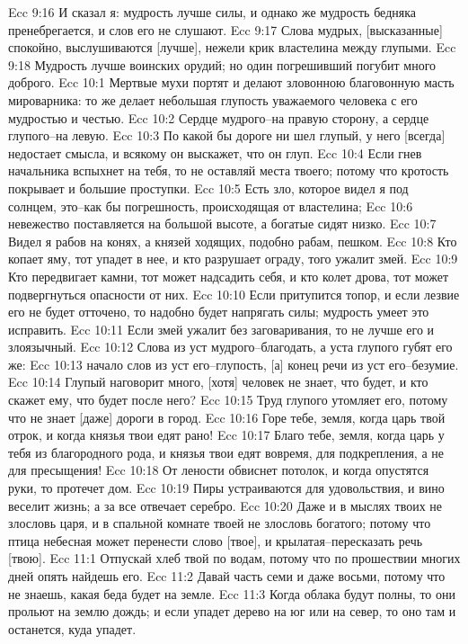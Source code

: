 Ecc 9:16  И сказал я: мудрость лучше силы, и однако же мудрость бедняка пренебрегается, и слов его не слушают.
Ecc 9:17  Слова мудрых, [высказанные] спокойно, выслушиваются [лучше], нежели крик властелина между глупыми.
Ecc 9:18  Мудрость лучше воинских орудий; но один погрешивший погубит много доброго.
Ecc 10:1  Мертвые мухи портят и делают зловонною благовонную масть мироварника: то же делает небольшая глупость уважаемого человека с его мудростью и честью.
Ecc 10:2  Сердце мудрого--на правую сторону, а сердце глупого--на левую.
Ecc 10:3  По какой бы дороге ни шел глупый, у него [всегда] недостает смысла, и всякому он выскажет, что он глуп.
Ecc 10:4  Если гнев начальника вспыхнет на тебя, то не оставляй места твоего; потому что кротость покрывает и большие проступки.
Ecc 10:5  Есть зло, которое видел я под солнцем, это--как бы погрешность, происходящая от властелина;
Ecc 10:6  невежество поставляется на большой высоте, а богатые сидят низко.
Ecc 10:7  Видел я рабов на конях, а князей ходящих, подобно рабам, пешком.
Ecc 10:8  Кто копает яму, тот упадет в нее, и кто разрушает ограду, того ужалит змей.
Ecc 10:9  Кто передвигает камни, тот может надсадить себя, и кто колет дрова, тот может подвергнуться опасности от них.
Ecc 10:10  Если притупится топор, и если лезвие его не будет отточено, то надобно будет напрягать силы; мудрость умеет это исправить.
Ecc 10:11  Если змей ужалит без заговаривания, то не лучше его и злоязычный.
Ecc 10:12  Слова из уст мудрого--благодать, а уста глупого губят его же:
Ecc 10:13  начало слов из уст его--глупость, [а] конец речи из уст его--безумие.
Ecc 10:14  Глупый наговорит много, [хотя] человек не знает, что будет, и кто скажет ему, что будет после него?
Ecc 10:15  Труд глупого утомляет его, потому что не знает [даже] дороги в город.
Ecc 10:16  Горе тебе, земля, когда царь твой отрок, и когда князья твои едят рано!
Ecc 10:17  Благо тебе, земля, когда царь у тебя из благородного рода, и князья твои едят вовремя, для подкрепления, а не для пресыщения!
Ecc 10:18  От лености обвиснет потолок, и когда опустятся руки, то протечет дом.
Ecc 10:19  Пиры устраиваются для удовольствия, и вино веселит жизнь; а за все отвечает серебро.
Ecc 10:20  Даже и в мыслях твоих не злословь царя, и в спальной комнате твоей не злословь богатого; потому что птица небесная может перенести слово [твое], и крылатая--пересказать речь [твою].
Ecc 11:1  Отпускай хлеб твой по водам, потому что по прошествии многих дней опять найдешь его.
Ecc 11:2  Давай часть семи и даже восьми, потому что не знаешь, какая беда будет на земле.
Ecc 11:3  Когда облака будут полны, то они прольют на землю дождь; и если упадет дерево на юг или на север, то оно там и останется, куда упадет.
